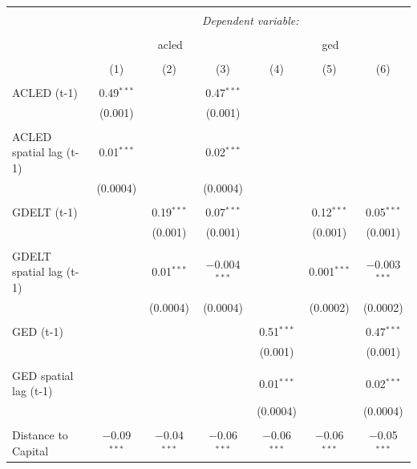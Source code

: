 \documentclass[hidelinks]{article}
\begin{document}
\begin{table}[!htbp] \centering 
  \caption{} 
  \label{} 
\begin{tabular}{@{\extracolsep{5pt}}lcccccc} 
\\[-1.8ex]\hline 
\hline \\[-1.8ex] 
 & \multicolumn{6}{c}{\textit{Dependent variable:}} \\ 
\cline{2-7} 
\\[-1.8ex] & \multicolumn{3}{c}{acled} & \multicolumn{3}{c}{ged} \\ 
\\[-1.8ex] & (1) & (2) & (3) & (4) & (5) & (6)\\ 
\hline \\[-1.8ex] 
ACLED (t-1) & 0.49$^{***}$ &  & 0.47$^{***}$ &  &  &  \\ 
  & (0.001) &  & (0.001) &  &  &  \\ 
  & & & & & & \\ 
ACLED spatial lag (t-1) & 0.01$^{***}$ &  & 0.02$^{***}$ &  &  &  \\ 
  & (0.0004) &  & (0.0004) &  &  &  \\ 
  & & & & & & \\ 
GDELT (t-1) &  & 0.19$^{***}$ & 0.07$^{***}$ &  & 0.12$^{***}$ & 0.05$^{***}$ \\ 
  &  & (0.001) & (0.001) &  & (0.001) & (0.001) \\ 
  & & & & & & \\ 
GDELT spatial lag (t-1) &  & 0.01$^{***}$ & $-$0.004$^{***}$ &  & 0.001$^{***}$ & $-$0.003$^{***}$ \\ 
  &  & (0.0004) & (0.0004) &  & (0.0002) & (0.0002) \\ 
  & & & & & & \\ 
GED (t-1) &  &  &  & 0.51$^{***}$ &  & 0.47$^{***}$ \\ 
  &  &  &  & (0.001) &  & (0.001) \\ 
  & & & & & & \\ 
GED spatial lag (t-1) &  &  &  & 0.01$^{***}$ &  & 0.02$^{***}$ \\ 
  &  &  &  & (0.0004) &  & (0.0004) \\ 
  & & & & & & \\ 
Distance to Capital & $-$0.09$^{***}$ & $-$0.04$^{***}$ & $-$0.06$^{***}$ & $-$0.06$^{***}$ & $-$0.06$^{***}$ & $-$0.05$^{***}$ \\ 

\end{tabular}
\end{table}
\end{document}

